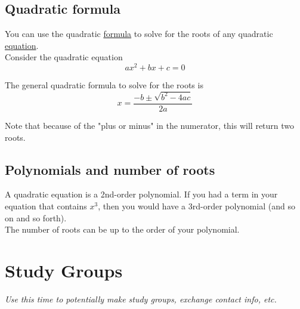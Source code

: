 \documentclass{article}
\begin{document}
\subsection{Quadratic formula}
You can use the quadratic \underline{formula} to solve for the roots of any quadratic \underline{equation}.\\

Consider the quadratic equation
\[ax^2 + bx + c = 0\]

The general quadratic formula to solve for the roots is
\[x = \frac{-b \pm \sqrt{b^2 - 4ac}}{2a}\]

Note that because of the "plus or minus" in the numerator, this will return two roots. 

\subsection{Polynomials and number of roots}
A quadratic equation is a 2nd-order polynomial. If you had a term in your equation that contains $x^3$, then you would have a 3rd-order polynomial (and so on and so forth). \\

The number of roots can be up to the order of your polynomial. 

\section{Study Groups}
\textit{Use this time to potentially make study groups, exchange contact info, etc.}
\end{document}
